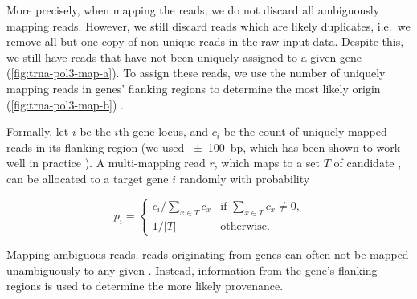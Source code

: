 More precisely, when mapping the reads, we do not discard all ambiguously
mapping reads. However, we still discard reads which are likely \pcr duplicates,
i.e.\ we remove all but one copy of non-unique reads in the raw input data.
Despite this, we still have reads that have not been uniquely assigned to a
given \trna gene (\cref{fig:trna-pol3-map-a}). To assign these reads, we use the
number of uniquely mapping reads in \trna genes’ flanking regions to determine
the most likely origin (\cref{fig:trna-pol3-map-b}) \citep{Kutter:2011}.

Formally, let \(i\) be the \(i\)th \trna gene locus, and \(c_i\) be the count of
uniquely mapped reads in its flanking region (we used \SI{\pm100}{bp}, which has
been shown to work well in practice \citep{Kutter:2011}). A multi-mapping read
\(r\), which maps to a set \(T\) of candidate \trna[s], can be allocated to a
target \trna gene \(i\) randomly with probability

\begin{equation}
    p_i = \begin{cases}
        c_i \big/ \sum_{x \in T}c_x &
            \text{if \(\sum_{x \in T}c_x \neq 0\),} \\
        1 \big/ \vert T \rvert & \text{otherwise.}
    \end{cases}
\end{equation}

    {Mapping ambiguous  reads.}
    {\chip reads originating from \trna genes can often not be mapped
    unambiguously to any given \trna. Instead, information from the gene’s
    flanking regions is used to determine the more likely provenance.}
